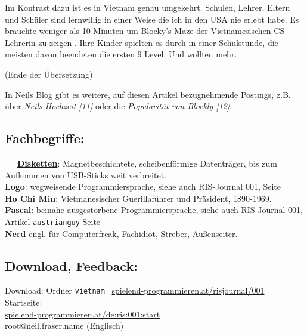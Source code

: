 \documentclass[10pt,a4paper,ngerman,twoside]{article} %
\begin{document}
\begin{multicols}{3}
Im Kontrast dazu ist es in Vietnam genau umgekehrt. Schulen, Lehrer, Eltern und Schüler sind lernwillig in einer Weise die ich in den USA nie erlebt habe. Es brauchte weniger als 10 Minuten um Blocky's Maze der Vietnamesischen CS Lehrerin zu zeigen . Ihre Kinder spielten es durch in einer Schulstunde, die meisten davon beendeten die ersten 9 Level. Und wollten mehr.

(Ende der Übersetzung)

In Neils Blog gibt es weitere, auf diesen Artikel bezugnehmende Postings, z.B. über \href{https://neil.fraser.name/news/2013/04/15/}{\textit{Neils Hochzeit [11]}} oder die \href{https://neil.fraser.name/news/2013/12/31/}{\textit{Popularität von Blockly [12]}}. 

\subsection*{Fachbegriffe:}

~~~\href{http://de.wikipedia.org/wiki/Diskette}{\textbf{Disketten}}: Magnetbeschichtete, scheibenförmige Datenträger, bis zum Aufkommen von USB-Sticks weit verbreitet. \\

\textbf{Logo}: wegweisende Programmiersprache, siehe auch RIS-Journal 001, Seite \pageref{austrianguy} \\

\textbf{Ho Chi Min}: Vietmanesischer Guerillaführer und Präsident, 1890-1969. \\

\textbf{Pascal}: beinahe ausgestorbene Programmiersprache, siehe auch RIS-Journal 001, Artikel \texttt{austrianguy} Seite \pageref{austrianguy} \\

\href{https://de.wikipedia.org/wiki/Nerd}{\textbf{Nerd}} engl. für Computerfreak, Fachidiot, Streber, Außenseiter.


\subsection*{Download, Feedback:}
\footnotesize{
Download: Ordner \texttt{vietnam} \Mundus\ \href{http://spielend-programmieren.at/risjournal/001}{spielend-programmieren.at/risjournal/001}\\
Startseite:\\
\href{http://spielend-programmieren.at/de:ris:001:start}{spielend-programmieren.at/de:ris:001:start}\\ 
\Letter\:  root@neil.fraser.name (Englisch)\\}
\normalsize
 


\end{multicols}
\end{document}
